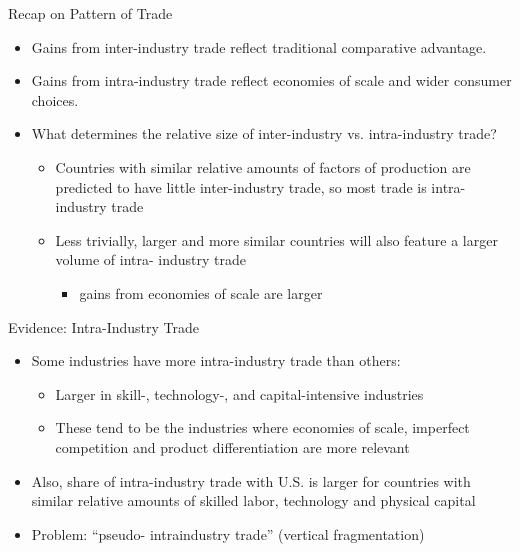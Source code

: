 \documentclass[10pt,hyperref={CJKbookmarks=true},xcolor=dvipsnames,aspectratio=169]{beamer}
\begin{document}
\begin{frame}{Recap on Pattern of Trade }

\begin{itemize}
\item Gains from inter-industry trade reflect traditional comparative advantage. 
\item Gains from intra-industry trade reflect economies of scale and wider
consumer choices. 
\item What determines the relative size of inter-industry vs. intra-industry
trade? 

\begin{itemize}
\item Countries with similar relative amounts of factors of production are
predicted to have little inter-industry trade, so most trade is intra-industry
trade 
\item Less trivially, larger and more similar countries will also feature
a larger volume of intra- industry trade 

\begin{itemize}
\item gains from economies of scale are larger 
\end{itemize}
\end{itemize}
\end{itemize}
\end{frame}

\begin{frame}{Evidence: Intra-Industry Trade}

\begin{itemize}
\item Some industries have more intra-industry trade than others: 

\begin{itemize}
\item Larger in skill-, technology-, and capital-intensive industries 
\item These tend to be the industries where economies of scale, imperfect
competition and product differentiation are more relevant 
\end{itemize}
\item Also, share of intra-industry trade with U.S. is larger for countries
with similar relative amounts of skilled labor, technology and physical
capital 
\item Problem: “pseudo- intraindustry trade” (vertical fragmentation) 
\end{itemize}
\end{frame}
\end{document}
